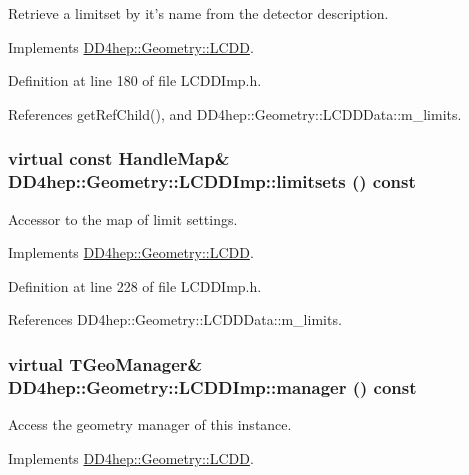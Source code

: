 Retrieve a limitset by it's name from the detector description. 

Implements \hyperlink{class_d_d4hep_1_1_geometry_1_1_l_c_d_d_a7e98996675e9c00d6b64010415511813}{DD4hep::Geometry::LCDD}.

Definition at line 180 of file LCDDImp.h.

References getRefChild(), and DD4hep::Geometry::LCDDData::m\_\-limits.\hypertarget{class_d_d4hep_1_1_geometry_1_1_l_c_d_d_imp_a6716761058e0530f528c669b4b0f0671}{
\subsubsection[{limitsets}]{\setlength{\rightskip}{0pt plus 5cm}virtual const {\bf HandleMap}\& DD4hep::Geometry::LCDDImp::limitsets () const}}
\label{class_d_d4hep_1_1_geometry_1_1_l_c_d_d_imp_a6716761058e0530f528c669b4b0f0671}


Accessor to the map of limit settings. 

Implements \hyperlink{class_d_d4hep_1_1_geometry_1_1_l_c_d_d_aeacdfb972606fef31bc1b69e6e982956}{DD4hep::Geometry::LCDD}.

Definition at line 228 of file LCDDImp.h.

References DD4hep::Geometry::LCDDData::m\_\-limits.\hypertarget{class_d_d4hep_1_1_geometry_1_1_l_c_d_d_imp_a957f19ec408e006ba36e216a8d63ae17}{
\subsubsection[{manager}]{\setlength{\rightskip}{0pt plus 5cm}virtual TGeoManager\& DD4hep::Geometry::LCDDImp::manager () const}}
\label{class_d_d4hep_1_1_geometry_1_1_l_c_d_d_imp_a957f19ec408e006ba36e216a8d63ae17}


Access the geometry manager of this instance. 

Implements \hyperlink{class_d_d4hep_1_1_geometry_1_1_l_c_d_d_af209f1ecaad7336e14ffee002215aa93}{DD4hep::Geometry::LCDD}.

